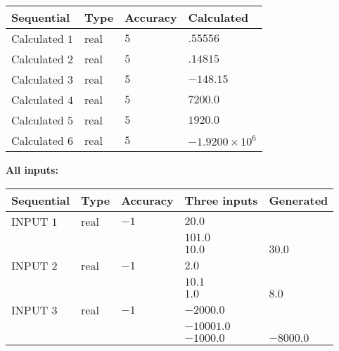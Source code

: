 \documentclass[12pt]{article}
\begin{document}
   
   
   
\noindent{}
   
   
  
  
\noindent\begin{tabular}{|l|l|l|l|}
\hline
 Sequential & Type & Accuracy & Calculated \\ 
\hline
 
 
  Calculated $           1$ & real & $           5 $ & 
 $ .55556 $ 
 \\  \hline  
 
 
  Calculated $           2$ & real & $           5 $ & 
 $ .14815 $ 
 \\  \hline  
 
 
  Calculated $           3$ & real & $           5 $ & 
 $ -148.15 $ 
 \\  \hline  
 
 
  Calculated $           4$ & real & $           5 $ & 
 $ 7200.0 $ 
 \\  \hline  
 
 
  Calculated $           5$ & real & $           5 $ & 
 $ 1920.0 $ 
 \\  \hline  
 
 
  Calculated $           6$ & real & $           5 $ & 
 $ -1.9200 \times 10^{6} $ 
 \\  \hline  
 \end{tabular}
   
   
   
   
\noindent\vspace{0.1in}\hspace{-0.08in} {\textbf{\Large{All inputs: }}}
   
   
  
  
\noindent\begin{tabular}{|l|l|l|l|l|}
\hline
 Sequential & Type & Accuracy & Three inputs & Generated \\ 
\hline
 
 
  INPUT $           1$ & real & $          -1 $ & $
 20.0
  $ & \\
  & & &  $
 101.0
  $ & \\
  & & &  $
 10.0
 $ & $ 30.0 $ 
 \\  \hline  
 
 
  INPUT $           2$ & real & $          -1 $ & $
 2.0
  $ & \\
  & & &  $
 10.1
  $ & \\
  & & &  $
 1.0
 $ & $ 8.0 $ 
 \\  \hline  
 
 
  INPUT $           3$ & real & $          -1 $ & $
 -2000.0
  $ & \\
  & & &  $
 -10001.0
  $ & \\
  & & &  $
 -1000.0
 $ & $ -8000.0 $ 
 \\  \hline  
 \end{tabular}
   
\end{document}
